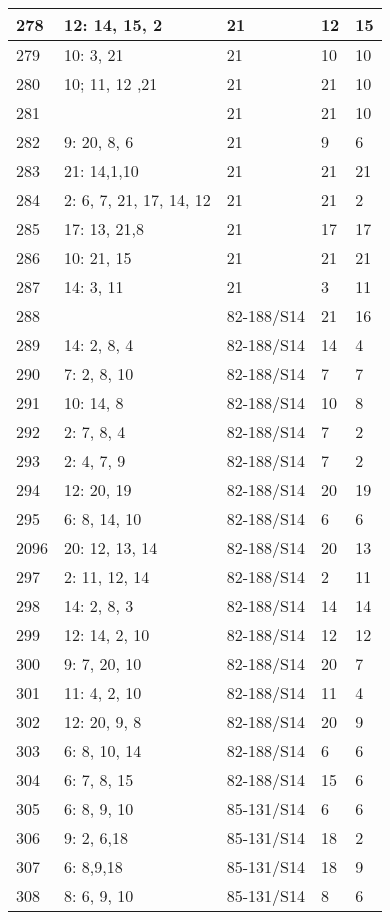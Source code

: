 \documentclass{article} %
\begin{document}
\begin{longtable}{| l | l | l | l | l |}
        278 & 12: 14, 15, 2 & 21 & 12 & 15 \\ \hline
        279 & 10: 3, 21 & 21 & 10 & 10 \\ \hline
        280 & 10; 11, 12 ,21 & 21 & 21 & 10 \\ \hline
        281 &  & 21 & 21 & 10 \\ \hline
        282 & 9: 20, 8, 6 & 21 & 9 & 6 \\ \hline
        283 & 21: 14,1,10 & 21 & 21 & 21 \\ \hline
        284 & 2: 6, 7, 21, 17, 14, 12 & 21 & 21 & 2 \\ \hline
        285 & 17: 13, 21,8 & 21 & 17 & 17 \\ \hline
        286 & 10: 21, 15 & 21 & 21 & 21 \\ \hline
        287 & 14: 3, 11 & 21 & 3 & 11 \\ \hline
        288 &  & 82-188/S14 & 21 & 16 \\ \hline
        289 & 14: 2, 8, 4 & 82-188/S14 & 14 & 4 \\ \hline
        290 & 7: 2, 8, 10 & 82-188/S14 & 7 & 7 \\ \hline
        291 & 10: 14, 8 & 82-188/S14 & 10 & 8 \\ \hline
        292 & 2: 7, 8, 4 & 82-188/S14 & 7 & 2 \\ \hline
        293 & 2: 4, 7, 9 & 82-188/S14 & 7 & 2 \\ \hline
        294 & 12: 20, 19 & 82-188/S14 & 20 & 19 \\ \hline
        295 & 6: 8, 14, 10 & 82-188/S14 & 6 & 6 \\ \hline
        2096 & 20: 12, 13, 14 & 82-188/S14 & 20 & 13 \\ \hline
        297 & 2: 11, 12, 14 & 82-188/S14 & 2 & 11 \\ \hline
        298 & 14: 2, 8, 3 & 82-188/S14 & 14 & 14 \\ \hline
        299 & 12: 14, 2, 10 & 82-188/S14 & 12 & 12 \\ \hline
        300 & 9: 7, 20, 10 & 82-188/S14 & 20 & 7 \\ \hline
        301 & 11: 4, 2, 10 & 82-188/S14 & 11 & 4 \\ \hline
        302 & 12: 20, 9, 8 & 82-188/S14 & 20 & 9 \\ \hline
        303 & 6: 8, 10, 14 & 82-188/S14 & 6 & 6 \\ \hline
        304 & 6: 7, 8, 15 & 82-188/S14 & 15 & 6 \\ \hline
        305 & 6: 8, 9, 10 & 85-131/S14 & 6 & 6 \\ \hline
        306 & 9: 2, 6,18 & 85-131/S14 & 18 & 2 \\ \hline
        307 & 6: 8,9,18 & 85-131/S14 & 18 & 9 \\ \hline
        308 & 8: 6, 9, 10 & 85-131/S14 & 8 & 6 \\ \hline
\end{longtable}
\end{document}
